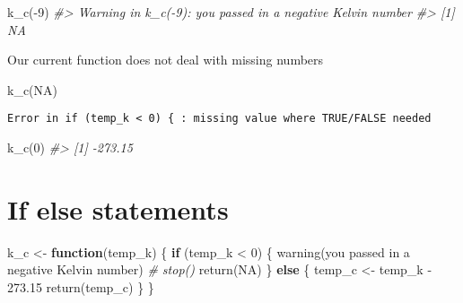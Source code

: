 \documentclass[
]{book}
\newenvironment{Shaded}{\begin{snugshade}}{\end{snugshade}}
\newcommand{\CommentTok}[1]{\textcolor[rgb]{0.56,0.35,0.01}{\textit{#1}}}
\newcommand{\ConstantTok}[1]{\textcolor[rgb]{0.00,0.00,0.00}{#1}}
\newcommand{\ControlFlowTok}[1]{\textcolor[rgb]{0.13,0.29,0.53}{\textbf{#1}}}
\newcommand{\DecValTok}[1]{\textcolor[rgb]{0.00,0.00,0.81}{#1}}
\newcommand{\FloatTok}[1]{\textcolor[rgb]{0.00,0.00,0.81}{#1}}
\newcommand{\FunctionTok}[1]{\textcolor[rgb]{0.00,0.00,0.00}{#1}}
\newcommand{\NormalTok}[1]{#1}
\newcommand{\OtherTok}[1]{\textcolor[rgb]{0.56,0.35,0.01}{#1}}
\newcommand{\SpecialCharTok}[1]{\textcolor[rgb]{0.00,0.00,0.00}{#1}}
\newcommand{\StringTok}[1]{\textcolor[rgb]{0.31,0.60,0.02}{#1}}
\begin{document}
\begin{Shaded}
\begin{Highlighting}[]
\FunctionTok{k\_c}\NormalTok{(}\SpecialCharTok{{-}}\DecValTok{9}\NormalTok{)}
\CommentTok{\#\textgreater{} Warning in k\_c({-}9): you passed in a negative Kelvin number}
\CommentTok{\#\textgreater{} [1] NA}
\end{Highlighting}
\end{Shaded}

Our current function does not deal with missing numbers

\begin{Shaded}
\begin{Highlighting}[]
\FunctionTok{k\_c}\NormalTok{(}\ConstantTok{NA}\NormalTok{)}
\end{Highlighting}
\end{Shaded}

\begin{verbatim}
Error in if (temp_k < 0) { : missing value where TRUE/FALSE needed
\end{verbatim}

\begin{Shaded}
\begin{Highlighting}[]
\FunctionTok{k\_c}\NormalTok{(}\DecValTok{0}\NormalTok{)}
\CommentTok{\#\textgreater{} [1] {-}273.15}
\end{Highlighting}
\end{Shaded}

\hypertarget{if-else-statements}{%
\section{If else statements}\label{if-else-statements}}

\begin{Shaded}
\begin{Highlighting}[]
\NormalTok{k\_c }\OtherTok{\textless{}{-}} \ControlFlowTok{function}\NormalTok{(temp\_k) \{}
    \ControlFlowTok{if}\NormalTok{ (temp\_k }\SpecialCharTok{\textless{}} \DecValTok{0}\NormalTok{) \{}
        \FunctionTok{warning}\NormalTok{(}\StringTok{\textquotesingle{}you passed in a negative Kelvin number\textquotesingle{}}\NormalTok{)}
        \CommentTok{\# stop()}
        \FunctionTok{return}\NormalTok{(}\ConstantTok{NA}\NormalTok{)}
\NormalTok{    \} }\ControlFlowTok{else}\NormalTok{ \{}
\NormalTok{        temp\_c }\OtherTok{\textless{}{-}}\NormalTok{ temp\_k }\SpecialCharTok{{-}} \FloatTok{273.15}
        \FunctionTok{return}\NormalTok{(temp\_c)}
\NormalTok{    \}}
\NormalTok{\}}
\end{Highlighting}
\end{Shaded}
\end{document}
